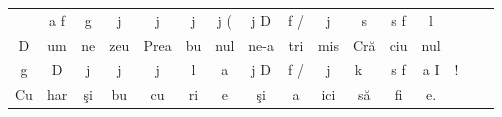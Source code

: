 \documentclass[12pt]{article}
\newcommand{\z}[1]{{\fontspec[]{BZ Byzantina} \fontsize{22}{22}\selectfont #1
}}
\newcommand{\zx}[1]{{\fontspec[]{BZ Ison} \fontsize{22}{22}\selectfont #1
}}
\newcommand{\zb}[1]{{\fontspec[]{BZ Palaia} \fontsize{22}{22}\selectfont #1
}}
\begin{document}
\begin{center}
\begin{tabular}{cccccccccccccccr}
 \vspace{-1cm}&  \z{a}\zx{f}  &\z{g} &\z{j} &\z{j} &\z{j} & \z{j}\zb{(}&\z{j}\zx{D} &\z{f}\zb{/} &\z{j} &\z{s} &\z{s}\zx{f}  &\z{l} &    \\
{\fontsize{50}{50}\selectfont D} &um & ne & zeu & Prea & bu & nul & ne-a & tri & mis & Cr\u a & ciu & nul & & \\ 
   \z{g} & \z{D} & \z{j}&\z{j} & \z{j} &  \z{l} & \z{a}\z{9} & \z{j}\zx{D} & \z{f}\zb{/} & \z{j} & \z{k}\z{~} & \z{s}\zx{f} &\z{a}\z{I}&\z{1}\z{!} \\
      Cu    & har   & \c si & bu & cu & ri      & e              & \c si  & a          & ici &  s\u a            & fi     & e. &
\end{tabular}

\end{center}
\end{document}
